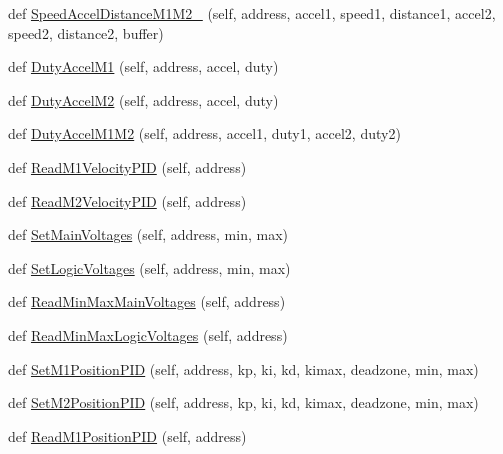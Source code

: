 \begin{DoxyCompactItemize}
\item 
def \mbox{\hyperlink{classtoxic__hardware_1_1roboclaw__3_1_1Roboclaw_a2cf733613d498449053cbb0ddc964205}{Speed\+Accel\+Distance\+M1\+M2\+\_}} (self, address, accel1, speed1, distance1, accel2, speed2, distance2, buffer)
\item 
def \mbox{\hyperlink{classtoxic__hardware_1_1roboclaw__3_1_1Roboclaw_a9a743669aa5263257f5443fc24d171fe}{Duty\+Accel\+M1}} (self, address, accel, duty)
\item 
def \mbox{\hyperlink{classtoxic__hardware_1_1roboclaw__3_1_1Roboclaw_a881053800292742cd8419a6158fe36ca}{Duty\+Accel\+M2}} (self, address, accel, duty)
\item 
def \mbox{\hyperlink{classtoxic__hardware_1_1roboclaw__3_1_1Roboclaw_a2aba2edd06d47a93e81ec7f3f3619f59}{Duty\+Accel\+M1\+M2}} (self, address, accel1, duty1, accel2, duty2)
\item 
def \mbox{\hyperlink{classtoxic__hardware_1_1roboclaw__3_1_1Roboclaw_a7d6b9aed2767ac9e9a7df14cde48efe8}{Read\+M1\+Velocity\+P\+ID}} (self, address)
\item 
def \mbox{\hyperlink{classtoxic__hardware_1_1roboclaw__3_1_1Roboclaw_a6130b63fbb5a30686b1f356a3429f0c2}{Read\+M2\+Velocity\+P\+ID}} (self, address)
\item 
def \mbox{\hyperlink{classtoxic__hardware_1_1roboclaw__3_1_1Roboclaw_acd85be507ba58fcd9d3456519c8aff9e}{Set\+Main\+Voltages}} (self, address, min, max)
\item 
def \mbox{\hyperlink{classtoxic__hardware_1_1roboclaw__3_1_1Roboclaw_a9a09e4eb5551bbd1738c4bec30c9519a}{Set\+Logic\+Voltages}} (self, address, min, max)
\item 
def \mbox{\hyperlink{classtoxic__hardware_1_1roboclaw__3_1_1Roboclaw_a5ca4a184f6501b75d547c6bdcbf3735f}{Read\+Min\+Max\+Main\+Voltages}} (self, address)
\item 
def \mbox{\hyperlink{classtoxic__hardware_1_1roboclaw__3_1_1Roboclaw_a6b08f6579fda6d73bc23b5ebe628f952}{Read\+Min\+Max\+Logic\+Voltages}} (self, address)
\item 
def \mbox{\hyperlink{classtoxic__hardware_1_1roboclaw__3_1_1Roboclaw_a86e5bc8af684f784abe72eac70851f3e}{Set\+M1\+Position\+P\+ID}} (self, address, kp, ki, kd, kimax, deadzone, min, max)
\item 
def \mbox{\hyperlink{classtoxic__hardware_1_1roboclaw__3_1_1Roboclaw_af20c35ba0d15081a0fe691601b7457e7}{Set\+M2\+Position\+P\+ID}} (self, address, kp, ki, kd, kimax, deadzone, min, max)
\item 
def \mbox{\hyperlink{classtoxic__hardware_1_1roboclaw__3_1_1Roboclaw_a570e8879933adbcb33e90eb45091fc31}{Read\+M1\+Position\+P\+ID}} (self, address)

\end{DoxyCompactItemize}
